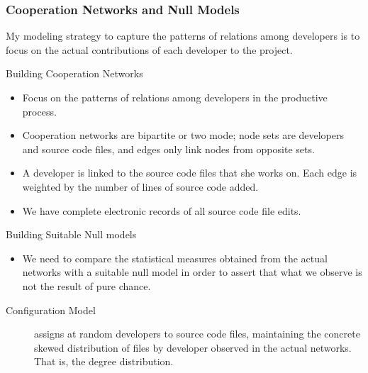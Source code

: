 \documentclass[ignorenonframetext,red,8pt,notes=hide]{beamer}
\begin{document}
\begin{frame}
\frametitle{Cooperation Networks and Null Models}

My modeling strategy to capture the patterns of relations among developers is to focus on the actual contributions of each developer to the project. 

\begin{block}{Building Cooperation Networks}
\begin{itemize}
\item Focus on the patterns of relations among developers in the productive process.
\item Cooperation networks are bipartite or two mode; node sets are developers and source code files, and edges only link nodes from opposite sets.
\item A developer is linked to the source code files that she works on. Each edge is weighted by the number of lines of source code added.
\item We have complete electronic records of all source code file edits.
\end{itemize}
\end{block}

\pause

\begin{block}{Building Suitable Null models}
\begin{itemize}
\item We need to compare the statistical measures obtained from the actual networks with a suitable null model in order to assert that what we observe is not the result of pure chance.
\end{itemize}
\begin{description}
\item [Configuration Model] assigns at random developers to source code files, maintaining the concrete skewed distribution of files by developer observed in the actual networks. That is, the degree distribution.
\end{description}
\end{block}

\end{frame}
\end{document}
